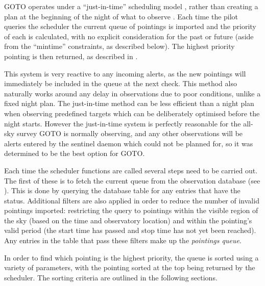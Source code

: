 \begin{colsection}

GOTO operates under a ``just-in-time'' scheduling model \citep[see, for example,][]{LCO_scheduling}, rather than creating a plan at the beginning of the night of what to observe \citep[see, for example,][]{ZTF_scheduler}. Each time the pilot queries the scheduler the current queue of pointings is imported and the priority of each is calculated, with no explicit consideration for the past or future (aside from the ``mintime'' constraints, as described below). The highest priority pointing is then returned, as described in .

This system is very reactive to any incoming alerts, as the new pointings will immediately be included in the queue at the next check. This method also naturally works around any delay in observations due to poor conditions, unlike a fixed night plan. The just-in-time method can be less efficient than a night plan when observing predefined targets which can be deliberately optimised before the night starts. However the just-in-time system is perfectly reasonable for the all-sky survey GOTO is normally observing, and any other observations will be alerts entered by the sentinel daemon which could not be planned for, so it was determined to be the best option for GOTO.\@

Each time the scheduler functions are called several steps need to be carried out. The first of these is to fetch the current queue from the observation database (see ). This is done by querying the database  table for any entries that have the  status. Additional filters are also applied in order to reduce the number of invalid pointings imported: restricting the query to pointings within the visible region of the sky (based on the time and observatory location) and within the pointing's valid period (the start time has passed and stop time has not yet been reached). Any entries in the table that pass these filters make up the \emph{pointings queue}.

In order to find which pointing is the highest priority, the queue is sorted using a variety of parameters, with the pointing sorted at the top being returned by the scheduler. The sorting criteria are outlined in the following sections.

\end{colsection}


